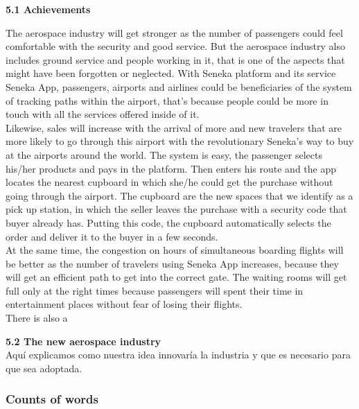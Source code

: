 \documentclass[]{article}
\newcommand\wordcount{
}
\begin{document}
\Large{\textbf{5.1 Achievements}\\}

The aerospace industry will get stronger as the number of passengers could feel comfortable with the security and good service. But the aerospace industry also includes ground service and people working in it, that is one of the aspects that might have been forgotten or neglected. With Seneka platform and its service Seneka App, passengers, airports and airlines could be beneficiaries of the system of tracking paths within the airport, that's because people could be more in touch with all the services offered inside of it.\\

Likewise, sales will increase with the arrival of more and new travelers that are more likely to go through this airport with the revolutionary Seneka's way to buy at the airports around the world. The system is easy, the passenger selects his/her products and pays in the platform. Then enters his route and the app locates the nearest cupboard in which she/he could get the purchase without going through the airport. The cupboard are the new spaces that we identify as a pick up station, in which the seller leaves the purchase with a security code that buyer already has. Putting this code, the cupboard automatically selects the order and deliver it to the buyer in a few seconds.\\

At the same time, the congestion on hours of simultaneous boarding flights will be better as the number of travelers using Seneka App increases, because they will get an efficient path to get into the correct gate. The waiting rooms will get full only at the right times because passengers will spent their time in entertainment places without fear of losing their flights.\\

There is also a 

\Large{\textbf{5.2 The new aerospace industry}\\}
Aquí explicamos como nuestra idea innovaría la industria y que es necesario para que sea adoptada.



\subsubsection*{Counts of words} 
\wordcount
\end{document}
